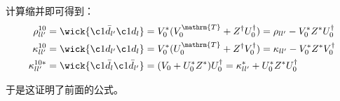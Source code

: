 \begin{booknote*}
计算缩并即可得到：
\begin{align*}
\rho^{10}_{ll^{\prime}} & =\wick{\c1{\bar{d}_{l^{\prime}}}\c1{d_{l}}}=V^{*}_{0}(V^{\mathrm{T}}_{0}+Z^{\dagger}U^{\dagger}_{0})=\rho_{ll^{\prime}}-V^{*}_{0}Z^{*}U^{\dagger}_{0}\\
\kappa^{10}_{ll^{\prime}} & =\wick{\c1{d_{l^{\prime}}}\c1{d_{l}}}=V^{*}_{0}(U^{\mathrm{T}}_{0}+Z^{\dagger}V^{\dagger}_{0})=\kappa_{ll^{\prime}}-V^{*}_{0}Z^{*}V^{\dagger}_{0}\\
\kappa^{10*}_{ll^{\prime}} & =\wick{\c1{\bar{d}_{l}}\c1{\bar{d}_{l^{\prime}}}}=(V_{0}+U^{*}_{0}Z^{*})U^{\dagger}_{0}=\kappa^{*}_{ll^{\prime}}+U^{*}_{0}Z^{*}U^{\dagger}_{0}
\end{align*}

于是这证明了前面的公式。
\end{booknote*}

